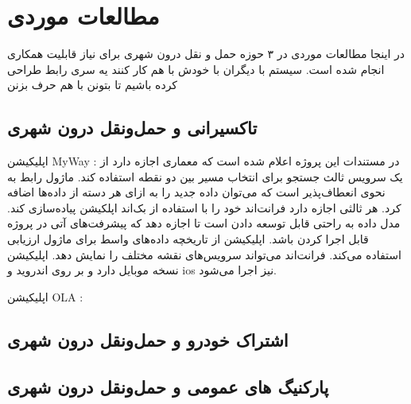 \section{مطالعات موردی}
در اینجا مطالعات موردی در ۳ حوزه حمل و نقل درون شهری برای نیاز قابلیت همکاری انجام شده است. 
سیستم با دیگران
با خودش 
با هم کار کنند 
یه سری رابط طراحی کرده باشیم تا بتونن با هم حرف بزنن 

\subsection{تاکسیرانی و حمل‌و‌نقل درون شهری}

اپلیکیشن MyWay : در مستندات این پروژه اعلام شده است که معماری اجازه دارد از یک سرویس ثالث جستجو برای انتخاب مسیر بین دو نقطه استفاده کند. ماژول رابط به نحوی انعطاف‌پذیر است که می‌توان داده جدید را به ازای هر دسته از داده‌ها اضافه کرد. هر ثالثی اجازه دارد فرانت‌اند خود را با استفاده از بک‌اند اپلکیشن پیاده‌سازی کند. مدل داده به راحتی قابل توسعه دادن است تا اجازه دهد که پیشرفت‌های آتی در پروژه قابل اجرا کردن باشد. اپلیکیشن از تاریخچه داده‌های واسط برای ماژول ارزیابی استفاده می‌کند. فرانت‌اند می‌تواند سرویس‌های نقشه مختلف را نمایش دهد. اپلیکیشن نسخه موبایل دارد و بر روی اندروید و ios نیز اجرا می‌شود. 

اپلیکیشن OLA : 

\subsection{اشتراک خودرو و حمل‌و‌نقل درون شهری}


\subsection{پارکنیگ های عمومی و حمل‌و‌نقل درون شهری}

